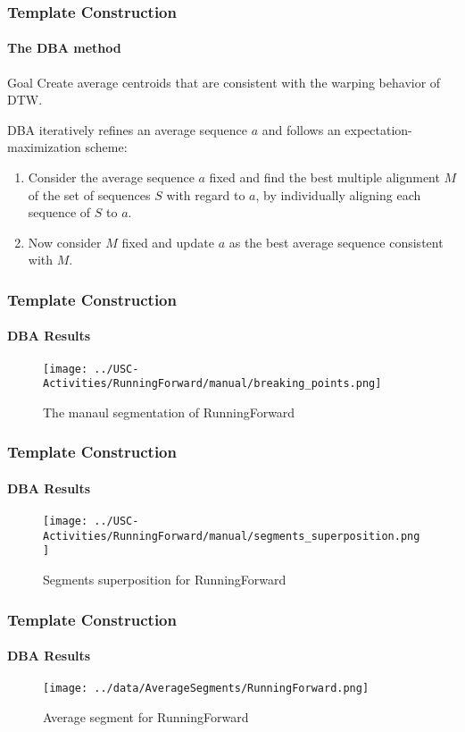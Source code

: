 \documentclass[11pt, sans, handout]{beamer}
\begin{document}
\begin{frame}
	\frametitle{Template Construction}
	\framesubtitle{The DBA method}
	
	\begin{alertblock}{Goal}
		Create average centroids that are consistent with the warping behavior of DTW. 
	\end{alertblock}
	
	DBA iteratively refines an average sequence $a$ and follows an expectation-maximization scheme:
	\begin{enumerate}
		\item Consider the average sequence $a$ fixed and find the best multiple alignment $M$ of the set of sequences $S$ with regard to $a$, by individually aligning each sequence of $S$ to $a$.
		\item Now consider $M$ fixed and update $a$ as the best average sequence consistent with $M$.
	\end{enumerate}
\end{frame}

\begin{frame}
	\frametitle{Template Construction}
	\framesubtitle{DBA Results}
	
	\begin{figure}[H]
		\centering
		\texttt{[image: ../USC-Activities/RunningForward/manual/breaking\_points.png]}
		\caption{The manaul segmentation of RunningForward}
		\label{bp_RF}
	\end{figure}
	
\end{frame}

\begin{frame}
	\frametitle{Template Construction}
	\framesubtitle{DBA Results}
	
	\begin{figure}[H]
		\centering
		\texttt{[image: ../USC-Activities/RunningForward/manual/segments\_superposition.png]}
		\caption{Segments superposition for RunningForward}
		\label{seg_sup_RF}
	\end{figure}
   
\end{frame}

\begin{frame}
	\frametitle{Template Construction}
	\framesubtitle{DBA Results}
	
	\begin{figure}[H]
		\centering
		\texttt{[image: ../data/AverageSegments/RunningForward.png]}
		\caption{Average segment for RunningForward}
		\label{av_seg_RF}
	\end{figure}
   
\end{frame}
\end{document}
